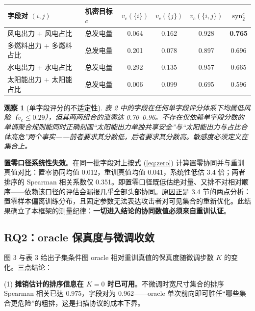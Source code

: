 \documentclass[10.5pt,compsoc,UTF8]{CjC}
\theoremstyle{mystyle}
\newtheorem{observation}{观察}
\begin{document}
\begin{table}[htbp]
\vspace {1mm}
\begin{center}
\begin{tabular}{llcccc}
\toprule
字段对 $(i,j)$ & 机密目标 $c$ & $v_c(\{i\})$ & $v_c(\{j\})$ & $v_c(\{i,j\})$ & $\mathrm{syn}_2^c$ \\
\midrule
风电出力 + 风电占比     & 总发电量 & 0.064 & 0.162 & 0.928 & \textbf{0.765} \\
多燃料出力 + 多燃料占比 & 总发电量 & 0.201 & 0.078 & 0.897 & 0.696 \\
水电出力 + 水电占比     & 总发电量 & 0.292 & 0.135 & 0.957 & 0.665 \\
太阳能出力 + 太阳能占比 & 总发电量 & 0.006 & 0.099 & 0.695 & 0.596 \\
\bottomrule
\end{tabular}
\label{tab:syn2}
\end{center}
\end{table}

\begin{observation}[单字段评分的不适定性]
表 2 中的字段在任何单字段评分体系下均属低风险（$v_c\le 0.29$），但其两两组合的泄露达 0.70--0.96。不存在仅依赖单字段分数的单调聚合规则能同时正确刻画“太阳能出力单独共享安全”与“太阳能出力与占比合体高危”两个事实——前者要求其分数低，后者要求其分数高。敏感度必须定义在集合上。
\end{observation}

\textbf{置零口径系统性失效}。在同一批字段对上按式 (\ref{eq:zero}) 计算置零协同并与重训真值对比：置零协同均值 0.012，重训真值均值 0.041，系统性低估 3.4 倍；两者排序的 Spearman 相关系数仅 0.351。即置零口径既低估绝对量、又排不对相对顺序——依赖该口径的评估会漏报几乎全部头部协同。原因正是 3.4 节的两点分析：置零样本偏离训练分布，且固定参数无法表达攻击者对可见集合的重新优化。此结果确立了本框架的测量纪律：\textbf{一切进入结论的协同数值必须来自重训认证}。

\subsection{RQ2：oracle 保真度与微调收敛}

图 3 与表 3 给出子集条件图 oracle 相对重训真值的保真度随微调步数 $K$ 的变化。三点结论：

(1) \textbf{摊销估计的排序信息在 $K=0$ 时已可用}。不微调时宽尺寸集合的排序 Spearman 相关已达 0.975，字段对为 0.962——oracle 单次前向即可胜任“哪些集合更危险”的粗排，这是扫描协议的成本下界。
\end{document}
